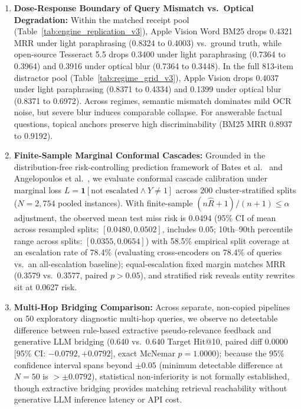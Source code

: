 \documentclass[conference]{IEEEtran}
\begin{document}
\begin{enumerate}
    \item \textbf{Dose-Response Boundary of Query Mismatch vs.\ Optical Degradation:} Within the matched receipt pool (Table~\ref{tab:engine_replication_v3}), Apple Vision Word BM25 drops 0.4321 MRR under light paraphrasing (0.8324 to 0.4003) vs.\ ground truth, while open-source Tesseract 5.5 drops 0.3400 under light paraphrasing (0.7364 to 0.3964) and 0.3916 under optical blur (0.7364 to 0.3448). In the full 813-item distractor pool (Table~\ref{tab:regime_grid_v3}), Apple Vision drops 0.4037 under light paraphrasing (0.8371 to 0.4334) and 0.1399 under optical blur (0.8371 to 0.6972). Across regimes, semantic mismatch dominates mild OCR noise, but severe blur induces comparable collapse. For answerable factual questions, topical anchors preserve high discriminability (BM25 MRR 0.8937 to 0.9192).
    \item \textbf{Finite-Sample Marginal Conformal Cascades:} Grounded in the distribution-free risk-controlling prediction framework of Bates et al.~\cite{bates2021conformal} and Angelopoulos et al.~\cite{angelopoulos2021gentle}, we evaluate conformal cascade calibration under marginal loss $L = \mathbf{1}[\text{not escalated} \land Y \ne 1]$ across 200 cluster-stratified splits ($N=2{,}754$ pooled instances). With finite-sample $(n\hat{R}+1)/(n+1) \le \alpha$ adjustment, the observed mean test miss risk is 0.0494 (95\% CI of mean across resampled splits: $[0.0480, 0.0502]$, includes 0.05; 10th--90th percentile range across splits: $[0.0355, 0.0654]$) with 58.5\% empirical split coverage at an escalation rate of 78.4\% (evaluating cross-encoders on 78.4\% of queries vs.\ an all-escalation baseline); equal-escalation fixed margin matches MRR (0.3579 vs.\ 0.3577, paired $p > 0.05$), and stratified risk reveals entity rewrites sit at 0.0627 risk.
    \item \textbf{Multi-Hop Bridging Comparison:} Across separate, non-copied pipelines on 50 exploratory diagnostic multi-hop queries, we observe no detectable difference between rule-based extractive pseudo-relevance feedback and generative LLM bridging (0.640 vs.\ 0.640 Target Hit@10, paired diff $0.0000$ [95\% CI: $-0.0792, +0.0792$], exact McNemar $p = 1.0000$); because the 95\% confidence interval spans beyond $\pm 0.05$ (minimum detectable difference at $N=50$ is $> \pm 0.0792$), statistical non-inferiority is not formally established, though extractive bridging provides matching retrieval reachability without generative LLM inference latency or API cost.
\end{enumerate}
\end{document}

